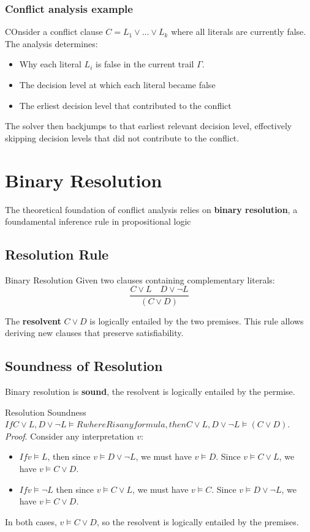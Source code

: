 \documentclass[a4paper]{article}
\theoremstyle{definition}
\begin{document}
\subsubsection{Conflict analysis example}
COnsider a conflict clause \( C = L_1 \vee \ldots \vee L_k \) where all literals are currently false. The analysis 
determines:
\begin{itemize}
    \item Why each literal \( L_i \) is false in the current trail \( \varGamma \).
    \item The decision level at which each literal became false
    \item The erliest decision level that contributed to the conflict
\end{itemize}
The solver then backjumps to that earliest relevant decision level, effectively skipping decision 
levels that did not contribute to the conflict.
\section{Binary Resolution}
The theoretical foundation of conflict analysis relies on \textbf{binary resolution}, a foundamental inference rule in propositional logic
\subsection{Resolution Rule}
\begin{definition}{Binary Resolution}
\centering Given two clauses containing complementary literals:
\[
  \frac{C \vee L \quad D \vee \lnot L}{(C \vee D)}
\]
\end{definition}
The \textbf{resolvent} \( C \vee D \) is logically entailed by the two premises. This rule allows deriving new 
clauses that preserve satisfiability.
\subsection{Soundness of Resolution}
Binary resolution is \textbf{sound}, the resolvent is logically entailed by the permise.
\begin{theorem}{Resolution Soundness}
\centering \( If {C \vee L, D \vee \lnot L} \models R where R is any formula, then {C \vee
L, D \vee \lnot L} \models (C \vee D) \).
\vspace{1em}
\noindent
\newline
\textit{Proof}. Consider any interpretation \( v \):
\begin{itemize}
    \item \( If v \models L \), then since \( v \models D \vee \lnot L \), we must 
        have \( v \models D \). Since \( v \models C \vee L \), we have \( v \models C \vee D \).
    \item \( If v \models \lnot L \) then since \( v \models C \vee L \), we must have \( v \models C \). Since \( v \models D \vee \lnot L \),
        we have \( v \models C \vee D \).
\end{itemize}
In both cases, \( v \models C \vee D \), so the resolvent is logically entailed by the premises.
\end{theorem}
\end{document}
